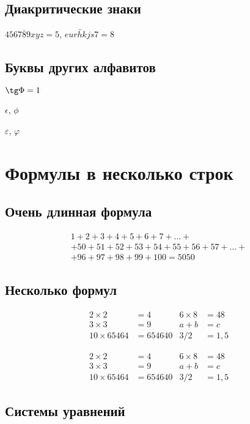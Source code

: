 \documentclass[a4paper,12pt]{article} %
\begin{document}
\subsection{Диакритические знаки}

$\overline{456789xyz}=5$, $\widetilde{eurhkjs7} = 8$

\subsection{Буквы других алфавитов}

$\tg \Phi = 1$

$\epsilon$, $\phi$

$\varepsilon$, $\varphi$

\section{Формулы в несколько строк}

\subsection{Очень длинная формула}

\begin{multline}
	1+ 2+3+4+5+6+7+\dots + \\ 
	+ 50+51+52+53+54+55+56+57 + \dots + \\ 
	+ 96+97+98+99+100=5050 \tag{S} \label{eq:sum}
\end{multline}


\subsection{Несколько формул}

\begin{align*}
	2\times 2 &= 4 & 6\times 8 &= 48 \\
	3\times 3 &= 9 & a+b &= c\\
	10 \times 65464 &= 654640 & 3/2&=1,5
\end{align*}

\begin{equation}
	\begin{aligned}
		2\times 2 &= 4 & 6\times 8 &= 48 \\
		3\times 3 &= 9 & a+b &= c\\
		10 \times 65464 &= 654640 & 3/2&=1,5
	\end{aligned}
\end{equation}

\subsection{Системы уравнений}
\end{document}
